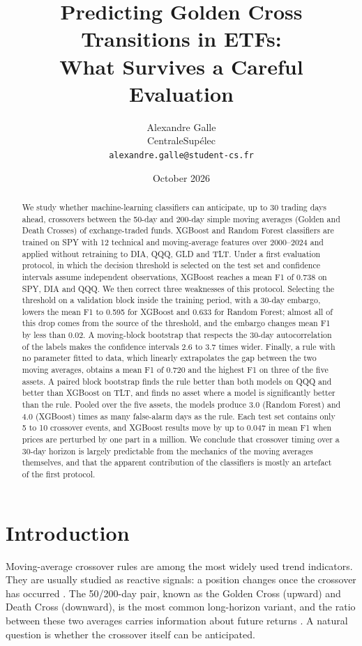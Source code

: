 \documentclass[11pt,a4paper]{article}
\title{Predicting Golden Cross Transitions in ETFs:\\What Survives a Careful Evaluation}
\author{Alexandre Galle\\CentraleSup\'elec\\\texttt{alexandre.galle@student-cs.fr}}
\date{October 2026}
\begin{document}
\maketitle

\begin{abstract}
We study whether machine-learning classifiers can anticipate, up to 30 trading days ahead,
crossovers between the 50-day and 200-day simple moving averages (Golden and Death Crosses)
of exchange-traded funds. XGBoost and Random Forest classifiers are trained on SPY with
12 technical and moving-average features over 2000--2024 and applied without retraining to
DIA, QQQ, GLD and TLT. Under a first evaluation protocol, in which the decision threshold is
selected on the test set and confidence intervals assume independent observations, XGBoost
reaches a mean F1 of 0.738 on SPY, DIA and QQQ. We then correct three weaknesses of this protocol.
Selecting the threshold on a validation block inside the training period, with a 30-day embargo,
lowers the mean F1 to 0.595 for XGBoost and 0.633 for Random Forest; almost all of this drop comes
from the source of the threshold, and the embargo changes mean F1 by less than 0.02. A moving-block
bootstrap that respects the 30-day autocorrelation of the labels makes the confidence intervals 2.6
to 3.7 times wider. Finally, a rule with no parameter fitted to data, which linearly extrapolates the
gap between the two moving averages, obtains a mean F1 of 0.720 and the highest F1 on three of the
five assets. A paired block bootstrap finds the rule better than both models on QQQ and better than
XGBoost on TLT, and finds no asset where a model is significantly better than the rule. Pooled over
the five assets, the models produce 3.0 (Random Forest) and 4.0 (XGBoost) times as many false-alarm
days as the rule. Each test set contains only 5 to 10 crossover events, and XGBoost results move by
up to 0.047 in mean F1 when prices are perturbed by one part in a million. We conclude that
crossover timing over a 30-day horizon is largely predictable from the mechanics of the moving
averages themselves, and that the apparent contribution of the classifiers is mostly an artefact
of the first protocol.
\end{abstract}

\section{Introduction}

Moving-average crossover rules are among the most widely used trend indicators. They are usually
studied as reactive signals: a position changes once the crossover has occurred
\citep{avramov2018}. The 50/200-day pair, known as the Golden Cross (upward) and Death Cross
(downward), is the most common long-horizon variant, and the ratio between these two averages
carries information about future returns \citep{bhootra2024}. A natural question is whether the
crossover itself can be anticipated.
\end{document}
